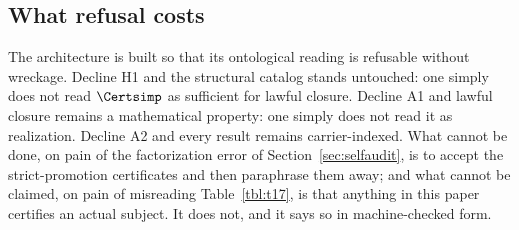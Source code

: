 \subsection{What refusal costs}

The architecture is built so that its ontological reading is refusable
without wreckage. Decline H1 and the structural catalog stands untouched:
one simply does not read $\Certsimp$ as sufficient for lawful closure.
Decline A1 and lawful closure remains a mathematical property: one simply
does not read it as realization. Decline A2 and every result remains
carrier-indexed. What cannot be done, on pain of the factorization error of
Section~\ref{sec:selfaudit}, is to accept the strict-promotion certificates
and then paraphrase them away; and what cannot be claimed, on pain of
misreading Table~\ref{tbl:t17}, is that anything in this paper certifies an
actual subject. It does not, and it says so in machine-checked form.

